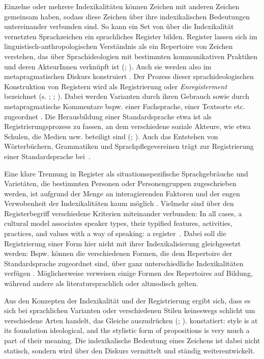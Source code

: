 Einzelne oder mehrere Indexikalitäten können Zeichen mit anderen Zeichen gemeinsam haben, sodass diese Zeichen über ihre indexikalischen Bedeutungen untereinander verbunden sind. 
So kann ein Set von über die Indexikalität vernetzten Sprachzeichen ein sprachliches Register bilden. 
Register lassen sich im linguistisch-anthropologischen Verständnis als ein Repertoire von Zeichen verstehen, das über Sprachideologien mit bestimmten kommunikativen Praktiken und deren AkteurInnen verknüpft ist (\citealp[s.][216]{Agha.1999}; \citeyear[38]{Agha2005}). 
Auch sie werden also im metapragmatischen Diskurs konstruiert \citep[s.][46]{Agha2005}. 
Der Prozess dieser sprachideologischen Konstruktion von Registern wird als Registrierung oder \textit{Enregisterment} bezeichnet (s. \citealp[231]{Agha2003}; \citealp[268]{Spitzmuller2013}; \citealp{Anderwald.2017}). 
Dabei werden Varianten durch ihren Gebrauch sowie durch metapragmatische Kommentare bspw. einer Fachsprache, einer Textsorte etc. zugeordnet \citep[s.][218]{Agha.1999}. 
Die Herausbildung einer Standardsprache etwa ist als Registrierungsprozess zu fassen, an dem verschiedene soziale Akteure, wie etwa Schulen, die Medien usw. beteiligt sind (\citealp[s.][64]{Woolard1994}; \citealp{Auer.2013}). 
Auch das Entstehen von W{\"o}rterb{\"u}chern, Grammatiken und Sprachpflegevereinen tr{\"a}gt zur Registrierung einer Standardsprache bei~\citep[s.][164]{Gal.2006b}.

Eine klare Trennung in Register als situationsspezifische Sprachgebr{\"a}uche und Variet{\"a}ten, die bestimmten Personen oder Personengruppen zugeschrieben werden, ist aufgrund der Menge an interagierenden Faktoren und der engen Verwobenheit der Indexikalit{\"a}ten kaum m{\"o}glich \citep[s.][120--121]{Eckert2005}. Vielmehr sind über den Registerbegriff verschiedene Kriterien miteinander verbunden: {\glqq}In all cases, a cultural model associates speaker types, their typified features, activities, practices, and values with a way of speaking: a register{\grqq}~\citep[117]{Gal.2016}. 
Dabei soll die Registrierung einer Form hier nicht mit ihrer Indexikalisierung gleichgesetzt werden:
Bspw. können die verschiedenen Formen, die dem Repertoire der Standardsprache zugeordnet sind, über ganz unterschiedliche Indexikalitäten verfügen \citep[s.][122]{Eckert2005}. 
Möglicherweise verweisen einige Formen des Repertoires auf Bildung, während andere als literatursprachlich oder altmodisch gelten.

Aus den Konzepten der Indexikalität und der Registrierung ergibt sich, dass es sich bei sprachlichen Varianten oder verschiedenen Stilen keineswegs schlicht um verschiedene Arten handelt, das Gleiche auszudrücken (\citealp[s.][28]{Auer.1989}; \citealp[88]{Coupland.2007}). 
\citet[96]{Eckert2012} konstatiert: \glqq style is at its foundation ideological, and the stylistic form of propositions is very much a part of their meaning\grqq.
Die indexikalische Bedeutung eines Zeichens ist dabei nicht statisch, sondern wird über den Diskurs vermittelt und ständig weiterentwickelt. 

